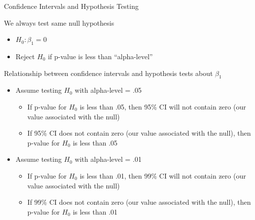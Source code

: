\documentclass[
  8pt,
  ignorenonframetext,
  dvipsnames]{beamer}
\providecommand{\tightlist}{%
  \setlength{\itemsep}{0pt}\setlength{\parskip}{0pt}}
\let\olditem\item
\renewcommand{\item}{%
  \olditem\vspace{4pt}
}
\begin{document}
\begin{frame}{Confidence Intervals and Hypothesis Testing}
\protect\hypertarget{confidence-intervals-and-hypothesis-testing}{}

We always test same null hypothesis

\begin{itemize}
\tightlist
\item
  \(H_0: \beta_1 = 0\)
\item
  Reject \(H_0\) if p-value is less than ``alpha-level''
\end{itemize}

\medskip

Relationship between confidence intervals and hypothesis tests about
\(\beta_1\)

\begin{itemize}
\tightlist
\item
  Assume testing \(H_0\) with alpha-level = .05

  \begin{itemize}
  \tightlist
  \item
    If p-value for \(H_0\) is less than .05, then 95\% CI will not
    contain zero (our value associated with the null)
  \item
    If 95\% CI does not contain zero (our value associated with the
    null), then p-value for \(H_0\) is less than .05
  \end{itemize}
\item
  Assume testing \(H_0\) with alpha-level = .01

  \begin{itemize}
  \tightlist
  \item
    If p-value for \(H_0\) is less than .01, then 99\% CI will not
    contain zero (our value associated with the null)
  \item
    If 99\% CI does not contain zero (our value associated with the
    null), then p-value for \(H_0\) is less than .01
  \end{itemize}
\end{itemize}

\end{frame}
\end{document}

